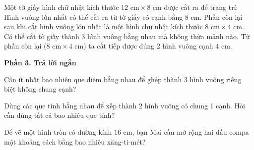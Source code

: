 \begin{ex} %
Một tờ giấy hình chữ nhật kích thước $12\text{ cm} \times 8\text{ cm}$ được cắt ra để trang trí:
\choiceTF
{\True Hình vuông lớn nhất có thể cắt ra từ tờ giấy có cạnh bằng $8\text{ cm}$.}
{\True Phần còn lại sau khi cắt hình vuông lớn nhất là một hình chữ nhật kích thước $8\text{ cm} \times 4\text{ cm}$.}
{Có thể cắt tờ giấy thành 3 hình vuông bằng nhau mà không thừa mảnh nào.}
{\True Từ phần còn lại ($8\text{ cm} \times 4\text{ cm}$) ta cắt tiếp được đúng 2 hình vuông cạnh $4\text{ cm}$.}
\end{ex}

\textbf{Phần 3. Trả lời ngắn}

\begin{ex} %
Cần ít nhất bao nhiêu que diêm bằng nhau để ghép thành 3 hình vuông riêng biệt không chung cạnh?
\end{ex}

\begin{ex} %
Dùng các que tính bằng nhau để xếp thành 2 hình vuông có chung 1 cạnh. Hỏi cần dùng tất cả bao nhiêu que tính?
\end{ex}

\begin{ex} %
Để vẽ một hình tròn có đường kính $16\text{ cm}$, bạn Mai cần mở rộng hai đầu compa một khoảng cách bằng bao nhiêu xăng-ti-mét?
\end{ex}


